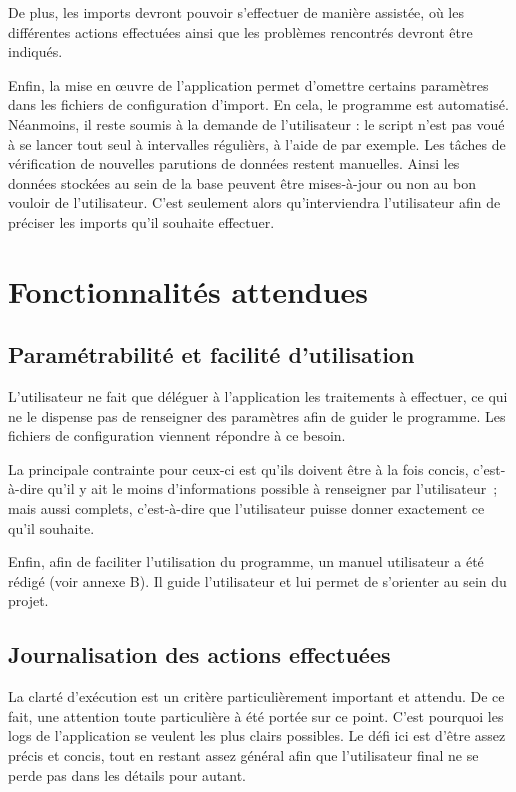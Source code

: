 De plus, les imports devront pouvoir s'effectuer de manière assistée, où les différentes actions effectuées ainsi que les problèmes rencontrés devront être indiqués.

Enfin, la mise en œuvre de l'application permet d'omettre certains paramètres dans les fichiers de configuration d'import. En cela, le programme est automatisé. Néanmoins, il reste soumis à la demande de l'utilisateur : le script n'est pas voué à se lancer tout seul à intervalles régulièrs, à l'aide de  par exemple. Les tâches de vérification de nouvelles parutions de données restent manuelles. Ainsi les données stockées au sein de la base peuvent être mises-à-jour ou non au bon vouloir de l'utilisateur. C'est seulement alors qu'interviendra l'utilisateur afin de préciser les imports qu'il souhaite effectuer.

\section{Fonctionnalités attendues}
  \subsection{Paramétrabilité et facilité d'utilisation}

L'utilisateur ne fait que déléguer à l'application les traitements à effectuer, ce qui ne le dispense pas de renseigner des paramètres afin de guider le programme. Les fichiers de configuration viennent répondre à ce besoin.

La principale contrainte pour ceux-ci est qu'ils doivent être à la fois concis, c'est-à-dire qu'il y ait le moins d'informations possible à renseigner par l'utilisateur~; mais aussi complets, c'est-à-dire que l'utilisateur puisse donner exactement ce qu'il souhaite.

Enfin, afin de faciliter l'utilisation du programme, un manuel utilisateur a été rédigé (voir annexe B). Il guide l'utilisateur et lui permet de s'orienter au sein du projet.

  \subsection{Journalisation des actions effectuées}

La clarté d'exécution est un critère particulièrement important et attendu. De ce fait, une attention toute particulière à été portée sur ce point. C'est pourquoi les logs de l'application se veulent les plus clairs possibles. Le défi ici est d'être assez précis et concis, tout en restant assez général afin que l'utilisateur final ne se perde pas dans les détails pour autant.

